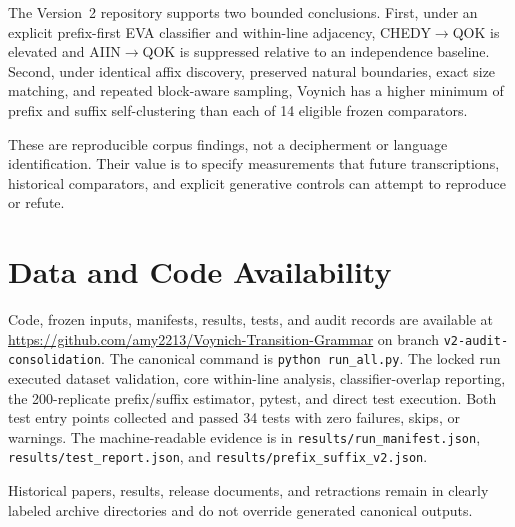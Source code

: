 \documentclass[11pt]{article}
\begin{document}
The Version~2 repository supports two bounded conclusions. First, under an
explicit prefix-first EVA classifier and within-line adjacency, CHEDY$\to$QOK
is elevated and AIIN$\to$QOK is suppressed relative to an independence
baseline. Second, under identical affix discovery, preserved natural
boundaries, exact size matching, and repeated block-aware sampling, Voynich
has a higher minimum of prefix and suffix self-clustering than each of 14
eligible frozen comparators.

These are reproducible corpus findings, not a decipherment or language
identification. Their value is to specify measurements that future
transcriptions, historical comparators, and explicit generative controls can
attempt to reproduce or refute.

\section{Data and Code Availability}

Code, frozen inputs, manifests, results, tests, and audit records are available
at \url{https://github.com/amy2213/Voynich-Transition-Grammar} on branch
\texttt{v2-audit-consolidation}. The canonical command is
\texttt{python run\_all.py}. The locked run executed dataset validation, core
within-line analysis, classifier-overlap reporting, the 200-replicate
prefix/suffix estimator, pytest, and direct test execution. Both test entry
points collected and passed 34 tests with zero failures, skips, or warnings.
The machine-readable evidence is in \texttt{results/run\_manifest.json},
\texttt{results/test\_report.json}, and
\texttt{results/prefix\_suffix\_v2.json}.

Historical papers, results, release documents, and retractions remain in
clearly labeled archive directories and do not override generated canonical
outputs.



\end{document}
